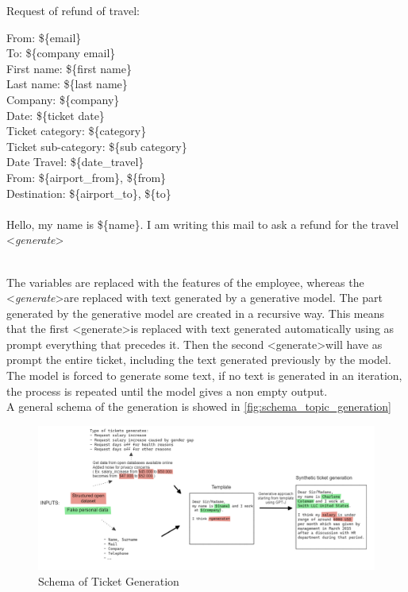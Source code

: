 Request of refund of travel:
\begin{adjustwidth}{1cm}{}
From: \$\{email\} \\
To: \$\{company email\} \\
First name: \$\{first name\}\\
Last name: \$\{last name\}\\
Company: \$\{company\}\\
Date: \$\{ticket date\}\\
Ticket category: \$\{category\}\\
Ticket sub-category: \$\{sub category\} \\
Date Travel: \$\{date\_travel\} \\
From: \$\{airport\_from\}, \$\{from\} \\
Destination: \$\{airport\_to\}, \$\{to\} \\
\\
Hello, my name is \$\{name\}. I am writing this mail to ask a refund for the travel \textless \textit{generate}\textgreater \\ \\

\end{adjustwidth}
        
The variables are replaced with the features of the employee, whereas the \textless \textit{generate}\textgreater \space are replaced with text generated by a generative model. The part generated by the generative model are created in a recursive way. This means that the first \textless generate\textgreater \space is replaced with text generated automatically using as prompt everything that precedes it. Then the second \textless generate\textgreater \space will have as prompt the entire ticket, including the text generated previously by the model. The model is forced to generate some text, if no text is generated in an iteration, the process is repeated until the model gives a non empty output. \\
A general schema of the generation is showed in \autoref{fig:schema_topic_generation}

\begin{figure}[h] 
    \includegraphics[width=\textwidth]{images/ticket_creation_schema.png}
    \caption{Schema of Ticket Generation}
    \label{fig:schema_topic_generation}
\end{figure}    


